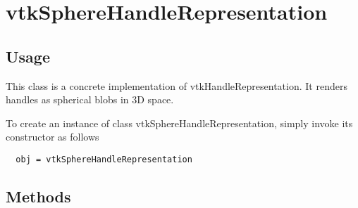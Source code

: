 \section{vtkSphereHandleRepresentation}

\subsection{Usage}

 This class is a concrete implementation of vtkHandleRepresentation. It 
 renders handles as spherical blobs in 3D space.


To create an instance of class vtkSphereHandleRepresentation, simply
invoke its constructor as follows
\begin{verbatim}
  obj = vtkSphereHandleRepresentation
\end{verbatim}
\subsection{Methods}


